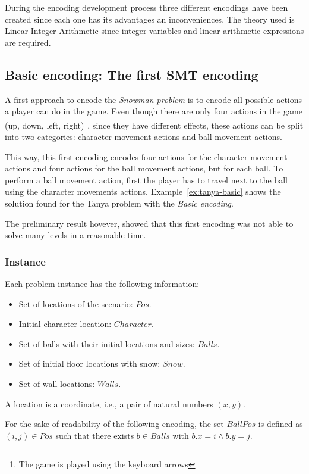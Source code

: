 \documentclass{report}
\theoremstyle{plain}
\begin{document}
During the encoding development process three different encodings have been created since each one has its advantages an inconveniences. The theory used is Linear Integer Arithmetic since integer variables and linear arithmetic expressions are required.

\subsection{Basic encoding: The first SMT encoding}
A first approach to encode the \emph{Snowman problem} is to encode all possible actions a player can do in the game. Even though there are only four actions in the game (up, down, left, right)\footnote{The game is played using the keyboard arrows}, since they have different effects, these actions can be split into two categories: character movement actions and ball movement actions.

This way, this first encoding encodes four actions for the character movement actions and four actions for the ball movement actions, but for each ball. To perform a ball movement action, first the player has to travel next to the ball using the character movements actions. Example~\ref{ex:tanya-basic} shows the solution found for the Tanya problem with the \emph{Basic encoding}.

The preliminary result hovever, showed that this first encoding was not able to solve many levels in a reasonable time.

\subsubsection{Instance}
Each problem instance has the following information:
\begin{itemize}
    \item Set of locations of the scenario: $Pos$.
    \item Initial character location: $Character$. 
    \item Set of balls with their initial locations and sizes: $Balls$.
    \item Set of initial floor locations with snow: $Snow$.
    \item Set of wall locations: $Walls$.
\end{itemize}

A location is a coordinate, i.e., a pair of natural numbers $(x,y)$.

For the sake of readability of the following encoding, the set $BallPos$ is defined as $(i,j)\in Pos$ such that there exists $b \in Balls$ with  $b.x = i \wedge b.y = j$.
\end{document}
